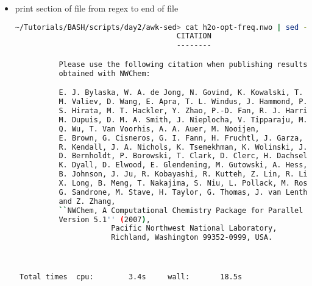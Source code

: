 \documentclass[slidestop,mathserif,compress,xcolor=svgnames]{beamer}
\begin{document}
\begin{frame}
{\begin{itemize}
\begin{lstlisting}[language=bash]
 ...... END OF ONE-ELECTRON INTEGRALS ......
      \end{lstlisting}
      \framebreak
    \item print section of file from regex to end of file
      \begin{lstlisting}[language=bash]
~/Tutorials/BASH/scripts/day2/awk-sed> cat h2o-opt-freq.nwo | sed -n '/CITATION/,$p'
                                     CITATION
                                     --------

          Please use the following citation when publishing results
          obtained with NWChem:

          E. J. Bylaska, W. A. de Jong, N. Govind, K. Kowalski, T. P. Straatsma,
          M. Valiev, D. Wang, E. Apra, T. L. Windus, J. Hammond, P. Nichols,
          S. Hirata, M. T. Hackler, Y. Zhao, P.-D. Fan, R. J. Harrison,
          M. Dupuis, D. M. A. Smith, J. Nieplocha, V. Tipparaju, M. Krishnan,
          Q. Wu, T. Van Voorhis, A. A. Auer, M. Nooijen,
          E. Brown, G. Cisneros, G. I. Fann, H. Fruchtl, J. Garza, K. Hirao,
          R. Kendall, J. A. Nichols, K. Tsemekhman, K. Wolinski, J. Anchell,
          D. Bernholdt, P. Borowski, T. Clark, D. Clerc, H. Dachsel, M. Deegan,
          K. Dyall, D. Elwood, E. Glendening, M. Gutowski, A. Hess, J. Jaffe,
          B. Johnson, J. Ju, R. Kobayashi, R. Kutteh, Z. Lin, R. Littlefield,
          X. Long, B. Meng, T. Nakajima, S. Niu, L. Pollack, M. Rosing,
          G. Sandrone, M. Stave, H. Taylor, G. Thomas, J. van Lenthe, A. Wong,
          and Z. Zhang,
          ``NWChem, A Computational Chemistry Package for Parallel Computers, 
          Version 5.1'' (2007),
                      Pacific Northwest National Laboratory,
                      Richland, Washington 99352-0999, USA.



 Total times  cpu:        3.4s     wall:       18.5s


\end{lstlisting}
\end{itemize}}
\end{frame}
\end{document}
